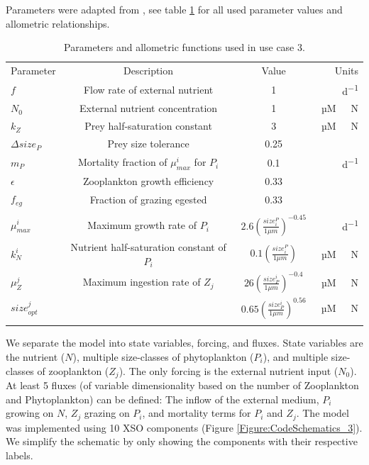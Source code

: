 \documentclass[journal abbreviation, manuscript]{copernicus}
\begin{document}
Parameters were adapted from \citet{Banas2011b}, see table \ref{Table:usecase3parameters} for all used parameter values and allometric relationships.
\begin{table}[t]
\caption{Parameters and allometric functions used in use case 3.}
\begin{tabular}{l c c r}
Parameter & Description & Value & Units \\
\tophline
$f$ & Flow rate of external nutrient & 1 & \unit{d^{-1}} \\
$N_0$ & External nutrient concentration & 1 & \unit{µM \ N} \\
$k_Z$ & Prey half-saturation constant & 3 & \unit{µM \ N}\\
$\Delta size_{P}$ & Prey size tolerance & 0.25 &  \\
$m_P$ & Mortality fraction of $\mu_{max}^i$ for $P_i$ & 0.1 & \unit{d^{-1}}\\
$\epsilon$ & Zooplankton growth efficiency & 0.33 & \\
$f_{eg}$ & Fraction of grazing egested & 0.33 & \\
\\

$\mu_{max}^i$ & Maximum growth rate of $P_i$ & $ 2.6 \left( \frac{size_i^{P}}{1\mu m} \right)^{-0.45}$  & \unit{d^{-1}} \\
$k_N^i$ & Nutrient half-saturation constant of $P_i$ & $ 0.1 \left( \frac{size_i^{P}}{1\mu m} \right)$ & \unit{µM \ N} \\

$\mu_Z^j$ & Maximum ingestion rate of $Z_j$ & $26 \left( \frac{size^i_{P}}{1\mu m} \right)^{-0.4}$ &\unit{µM \ N} \\

$size_{opt}^j$ &  & $0.65 \left( \frac{size_{P}^i}{1\mu m} \right)^{0.56}$ & \ \unit{µM \ N} \\

\bottomhline
\end{tabular}
\label{Table:usecase3parameters}
\end{table}
%


We separate the model into state variables, forcing, and fluxes. State variables are the nutrient ($N$), multiple size-classes of phytoplankton ($P_i$), and multiple size-classes of zooplankton ($Z_j$). The only forcing is the external nutrient input ($N_0$). At least 5 fluxes (of variable dimensionality based on the number of Zooplankton and Phytoplankton) can be defined: The inflow of the external medium, $P_i$ growing on $N$, $Z_j$ grazing on $P_i$, and mortality terms for $P_i$ and $Z_j$.
The model was implemented using 10 XSO components (Figure \ref{Figure:CodeSchematics_3}). We simplify the schematic by only showing the components with their respective labels.
\end{document}
